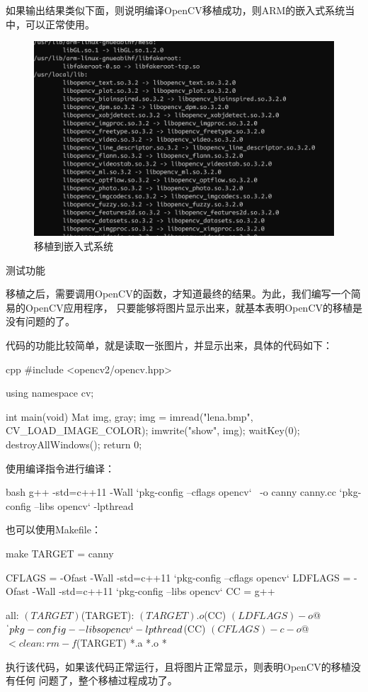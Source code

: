 \begin{outline}[enumerate]
如果输出结果类似下面，则说明编译OpenCV移植成功，则ARM的嵌入式系统当中，可以正常使用。
\begin{figure}[H]
  \centering
  \includegraphics[width=\linewidth]{cross_transplant.png}
  \caption{移植到嵌入式系统}
  \label{fig:cross_transplant}
\end{figure}

\1 测试功能

移植之后，需要调用OpenCV的函数，才知道最终的结果。为此，我们编写一个简易的OpenCV应用程序，
只要能够将图片显示出来，就基本表明OpenCV的移植是没有问题的了。

代码的功能比较简单，就是读取一张图片，并显示出来，具体的代码如下：
\begin{code-in-enumerate}{cpp}
#include <opencv2/opencv.hpp>

using namespace cv;

int main(void)
{
        Mat img, gray;
        img = imread("lena.bmp", CV_LOAD_IMAGE_COLOR);
        imwrite("show", img);
        waitKey(0);
        destroyAllWindows();
        return 0;
}
\end{code-in-enumerate}

使用编译指令进行编译：
\begin{code-in-enumerate}{bash}
g++ -std=c++11 -Wall `pkg-config --cflags opencv` \
    -o canny canny.cc  `pkg-config --libs opencv` -lpthread
\end{code-in-enumerate}

也可以使用Makefile：
\begin{code-in-enumerate}{make}
TARGET = canny

CFLAGS = -Ofast -Wall -std=c++11 `pkg-config --cflags opencv`
LDFLAGS = -Ofast -Wall -std=c++11 `pkg-config --libs opencv`
CC = g++

all: $(TARGET)

$(TARGET): $(TARGET).o
        $(CC) $(LDFLAGS) -o $@ $^ `pkg-config --libs opencv` -lpthread

        $(CC) $(CFLAGS) -c -o $@ $<

clean:
        rm -f $(TARGET) *.a *.o *~
\end{code-in-enumerate}

执行该代码，如果该代码正常运行，且将图片正常显示，则表明OpenCV的移植没有任何
问题了，整个移植过程成功了。

\end{outline}
